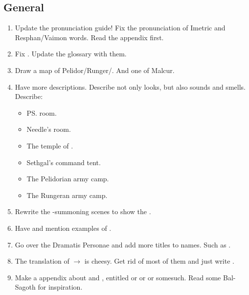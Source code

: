 \begin{garbage}
\subsection{General}
\begin{enumerate}
  \item 
    Update the pronunciation guide!
    Fix the pronunciation of Imetric and Resphan/Vaimon words. 
    Read the  appendix first. 
    
  \item 
    Fix . 
    Update the glossary with them. 
  
  \item  
    Draw a map of Pelidor/Runger/\Scyrum. 
    And one of Malcur. 
  
  \item 
    Have more descriptions. 
    Describe not only looks, but also sounds and smells. 
    Describe: 
    \begin{itemize}
      \item \ps{\Tiroco} room. 
      \item Needle's room. 
      \item The temple of \EreshKal. 
      \item Sethgal's command tent. 
      \item The Pelidorian army camp. 
      \item The Rungeran army camp. 
    \end{itemize}
  
  \item 
    Rewrite the \Archon-summoning scenes to show the . 
  
  \item 
    Have and mention examples of . 
  
  \item 
    Go over the Dramatis Personae and add more titles to names. 
    Such as . 
  
  \item 
    The translation of  $\to$  is cheesy. 
    Get rid of most of them and just write \quo{\Iquin}. 
  
  \item 
    Make a appendix about \matrices{} and , entitled  or  or  or somesuch. 
    Read some Bal-Sagoth for inspiration. 
    

\end{enumerate}
\end{garbage}
